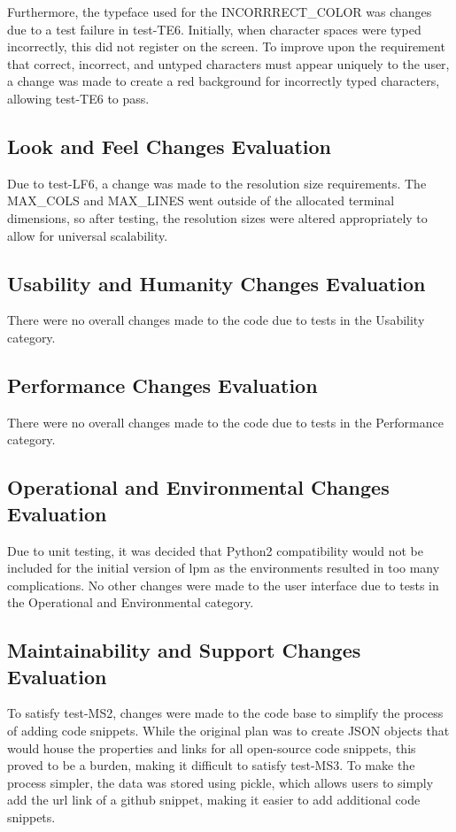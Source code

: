\documentclass[12pt, titlepage]{article}
\begin{document}
Furthermore, the typeface used for the INCORRRECT\_COLOR was changes due to a test failure in test-TE6. Initially, when character spaces were typed incorrectly, this did not register on the screen. To improve upon the requirement that correct, incorrect, and untyped characters must appear uniquely to the user, a change was made to create a red background for incorrectly typed characters, allowing test-TE6 to pass. \\

\subsection{Look and Feel Changes Evaluation}
Due to test-LF6, a change was made to the resolution size requirements. The MAX\_COLS and MAX\_LINES went outside of the allocated terminal dimensions, so after testing, the resolution sizes were altered appropriately to allow for universal scalability.

\subsection{Usability and Humanity Changes Evaluation}
There were no overall changes made to the code due to tests in the Usability category.

\subsection{Performance Changes Evaluation}
There were no overall changes made to the code due to tests in the Performance category.

\subsection{Operational and Environmental Changes Evaluation}
Due to unit testing, it was decided that Python2 compatibility would not be included for the initial version of lpm as the environments resulted in too many complications. No other changes were made to the user interface due to tests in the Operational and Environmental category.

\subsection{Maintainability and Support Changes Evaluation}

To satisfy test-MS2, changes were made to the code base to simplify the process of adding code snippets. While the original plan was to create JSON objects that would house the properties and links for all open-source code snippets, this proved to be a burden, making it difficult to satisfy test-MS3. To make the process simpler, the data was stored using pickle, which allows users to simply add the url link of a github snippet, making it easier to add additional code snippets.
\end{document}
